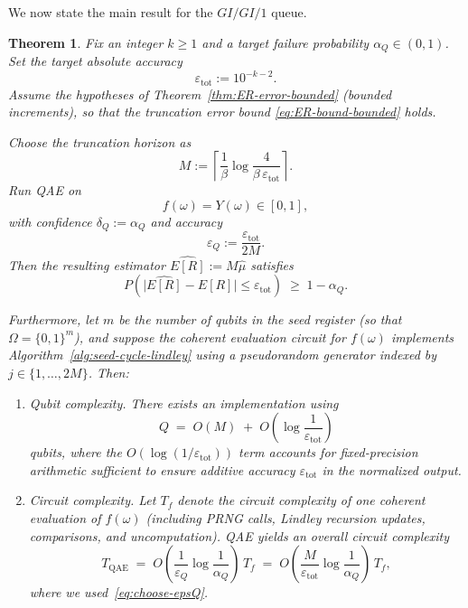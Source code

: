 \documentclass[11pt]{article}
\newtheorem{theorem}{Theorem}
\begin{document}
We now state the main result for the $GI/GI/1$ queue.
\begin{theorem}
\label{thm:choose-MC-for-ER}
Fix an integer $k\ge 1$ and a target failure probability
$\alpha_Q\in(0,1)$.
Set the target absolute accuracy
\[
\varepsilon_{\mathrm{tot}} := 10^{-k-2}.
\]
Assume the hypotheses of Theorem~\ref{thm:ER-error-bounded}
(bounded increments), so that the truncation error bound
\eqref{eq:ER-bound-bounded} holds.

Choose the truncation horizon as
\begin{equation}
\label{eq:choose-MC}
M := \left\lceil \frac{1}{\beta}\log\frac{4}{\beta\,\varepsilon_{\mathrm{tot}}}
\right\rceil.
\end{equation}
Run QAE on
\[
f(\omega)=Y(\omega)\in[0,1],
\]
with confidence $\delta_Q:=\alpha_Q$ and accuracy
\begin{equation}
\label{eq:choose-epsQ}
\varepsilon_Q := \frac{\varepsilon_{\mathrm{tot}}}{2M}.
\end{equation}
Then the resulting estimator $\widehat{E[R]}:=M\hat\mu$ satisfies
\[
P\!\left(
\bigl|\widehat{E[R]}-E[R]\bigr|\le \varepsilon_{\mathrm{tot}}
\right)\;\ge\;1-\alpha_Q.
\]

Furthermore, let $m$ be the number of qubits in the seed register (so that
$\Omega=\{0,1\}^m$), and suppose the coherent evaluation circuit for
$f(\omega)$ implements Algorithm~\ref{alg:seed-cycle-lindley} using a
pseudorandom generator indexed by $j\in\{1,\dots,2M\}$.
Then:

\begin{enumerate}
\item \textit{Qubit complexity.}
There exists an implementation using
\begin{equation}
\label{eq:qubits-cert}
Q
\;=\;
O(M)
\;+\;
O\!\left(\log\frac{1}{\varepsilon_{\mathrm{tot}}}\right)
\end{equation}
qubits, where the $O(\log(1/\varepsilon_{\mathrm{tot}}))$ term accounts for
fixed-precision arithmetic sufficient to ensure additive accuracy
$\varepsilon_{\mathrm{tot}}$ in the normalized output.

\item \textit{Circuit complexity.}
Let $T_f$ denote the circuit complexity of one coherent evaluation of
$f(\omega)$ (including PRNG calls, Lindley recursion updates, comparisons,
and uncomputation).
QAE yields an overall circuit complexity
\begin{equation}
\label{eq:gates-cert}
T_{\mathrm{QAE}}
\;=\;
O\!\left(
\frac{1}{\varepsilon_Q}\log\frac{1}{\alpha_Q}
\right)\,T_f
\;=\;
O\!\left(
\frac{M}{\varepsilon_{\mathrm{tot}}}\log\frac{1}{\alpha_Q}
\right)\,T_f,
\end{equation}
where we used~\eqref{eq:choose-epsQ}.


\end{enumerate}
\end{theorem}
\end{document}
